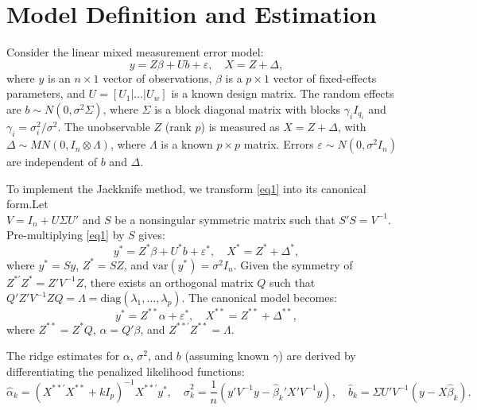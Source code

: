 \documentclass[twoside]{article}
\begin{document}
\section{Model Definition and Estimation}\label{Model}

Consider the linear mixed measurement error model:
\begin{equation}\label{eq1}
y = Z\beta + Ub + \varepsilon, \quad X = Z + \Delta, 
\end{equation}
where $y$ is an $n \times 1$ vector of observations, $\beta$ is a $p \times 1$ vector of fixed-effects parameters, and $U = [U_1 | \dots | U_w]$ is a known design matrix. The random effects are $b \sim N(0, \sigma^2 \Sigma)$, where $\Sigma$ is a block diagonal matrix with blocks $\gamma_i I_{q_i}$ and $\gamma_i = \sigma_i^2 / \sigma^2$. The unobservable $Z$ (rank $p$) is measured as $X = Z + \Delta$, with $\Delta \sim MN(0, I_n \otimes \Lambda)$, where $\Lambda$ is a known $p \times p$ matrix. Errors $\varepsilon \sim N(0, \sigma^2 I_n)$ are independent of $b$ and $\Delta$.

To implement the Jackknife method, we transform 
\eqref{eq1}
 into its canonical form.Let\\ $V = I_n + U\Sigma U'$ and $S$ be a nonsingular symmetric matrix such that $S'S = V^{-1}$. Pre-multiplying \eqref{eq1}
 by $S$ gives:
\begin{equation}
y^* = Z^*\beta + U^*b + \varepsilon^*, \quad X^* = Z^* + \Delta^*,
\end{equation}
where $y^* = Sy$, $Z^* = SZ$, and $\text{var}(y^*) = \sigma^2 I_n$. Given the symmetry of $Z^{*'}Z^* = Z'V^{-1}Z$, there exists an orthogonal matrix $Q$ such that $Q'Z'V^{-1}ZQ = \Lambda = \text{diag}(\lambda_1, \dots, \lambda_p)$. The canonical model becomes:
\begin{equation}
y^{*} = Z^{**}\alpha + \varepsilon^{*}, \quad X^{**} = Z^{**} + \Delta^{**},
\end{equation}
where $Z^{**} = Z^*Q$, $\alpha = Q'\beta$, and $Z^{**'}Z^{**} = \Lambda$. 

The ridge estimates for $\alpha$, $\sigma^2$, and $b$ (assuming known $\gamma$) are derived by differentiating the penalized likelihood functions:
\begin{equation}
\hat{\alpha}_k = (X^{**'}X^{**} + kI_p)^{-1} X^{**'}y^{*}, \quad \hat{\sigma}^2_k = \frac{1}{n}(y'V^{-1}y - \hat{\beta}_k'X'V^{-1}y), \quad \hat{b}_k = \Sigma U'V^{-1}(y - X\hat{\beta}_k).
\end{equation}
\end{document}
